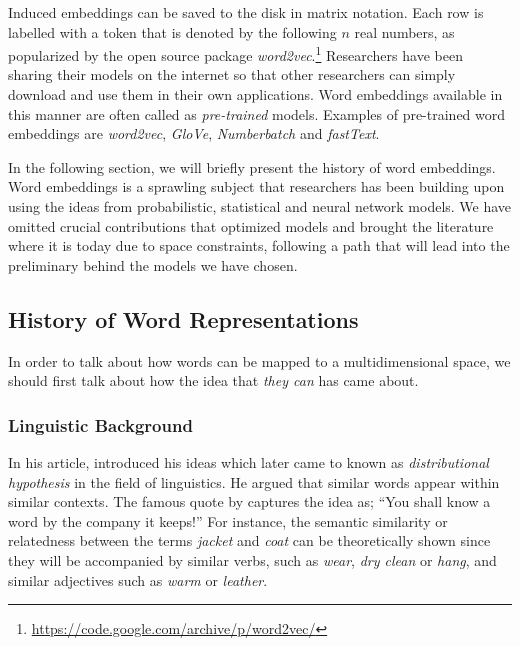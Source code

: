 Induced embeddings can be saved to the disk in matrix notation.
Each row is labelled with a token that is denoted by the following $n$ real numbers, as popularized by the open source package \emph{word2vec}.\footnote{\url{https://code.google.com/archive/p/word2vec/}}
Researchers have been sharing their models on the internet so that other researchers can simply download and use them in their own applications.
Word embeddings available in this manner are often called as \emph{pre-trained} models.
Examples of pre-trained word embeddings are \emph{word2vec}, \emph{GloVe}, \emph{Numberbatch} and \emph{fastText}.

In the following section, we will briefly present the history of word embeddings.
Word embeddings is a sprawling subject that researchers has been building upon using the ideas from probabilistic, statistical and neural network models.
We have omitted crucial contributions that optimized models and brought the literature where it is today due to space constraints, following a path that will lead into the preliminary behind the models we have chosen.

\subsection{History of Word Representations}%
\label{sub:history_of_word_representations}

In order to talk about how words can be mapped to a multidimensional space, we should first talk about how the idea that \emph{they can} has came about.

\subsubsection{Linguistic Background}%
\label{ssub:linguistic_background}

In his \citeyear{harris_distributional_1954} article, \textcite{harris_distributional_1954} introduced his ideas which later came to known as \emph{distributional hypothesis} in the field of linguistics.
He argued that similar words appear within similar contexts.
The famous quote by \textcite{firth_synopsis_1957} captures the idea as;
\enquote{You shall know a word by the company it keeps!}
For instance, the semantic similarity or relatedness between the terms \emph{jacket} and \emph{coat} can be theoretically shown since they will be accompanied by similar verbs, such as \emph{wear}, \emph{dry clean} or \emph{hang}, and similar adjectives such as \emph{warm} or \emph{leather}.

